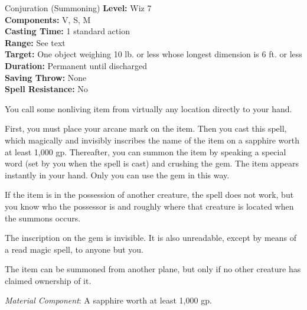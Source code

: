 {Conjuration (Summoning)}
{
	\textbf{Level:}
	Wiz 7\\
	\textbf{Components:}
	V, S, M\\
	\textbf{Casting Time:}
	1 standard action\\
	\textbf{Range:}
	See text\\
	\textbf{Target:}
	One object weighing 10 lb. or less whose longest dimension is 6 ft. or less\\
	\textbf{Duration:}
	Permanent until discharged\\
	\textbf{Saving Throw:}
	None\\
	\textbf{Spell Resistance:}
	No\\
}
{
	You call some nonliving item from virtually any location directly to your hand.

	First, you must place your arcane mark on the item. Then you cast this spell, which magically and invisibly inscribes the name of the item on a sapphire worth at least 1,000 gp. Thereafter, you can summon the item by speaking a special word (set by you when the spell is cast) and crushing the gem. The item appears instantly in your hand. Only you can use the gem in this way.

	If the item is in the possession of another creature, the spell does not work, but you know who the possessor is and roughly where that creature is located when the summons occurs.

	The inscription on the gem is invisible. It is also unreadable, except by means of a read magic spell, to anyone but you.

	The item can be summoned from another plane, but only if no other creature has claimed ownership of it.

	\textit{Material Component}:
	A sapphire worth at least 1,000 gp.

}
